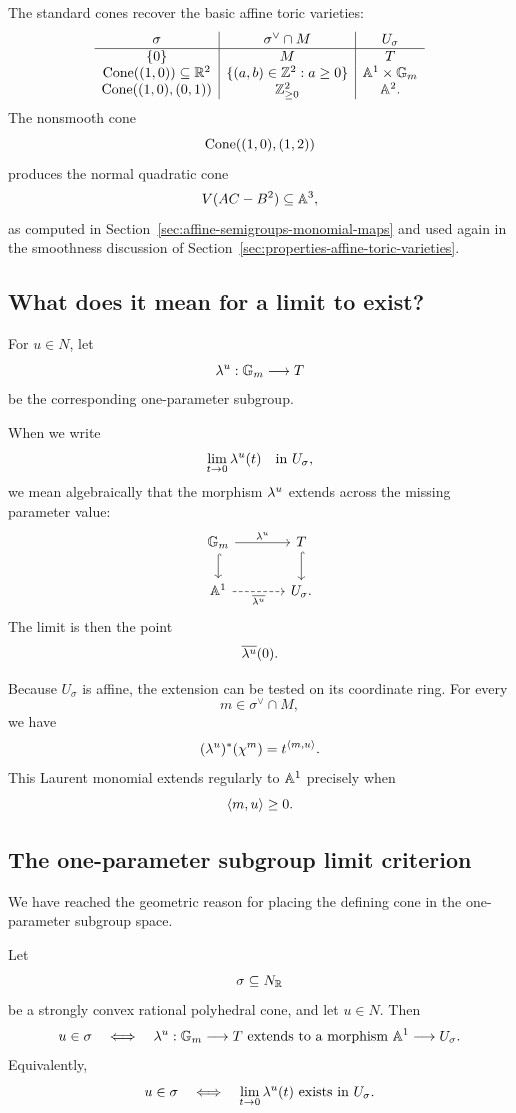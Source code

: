 The standard cones recover the basic affine toric varieties:
\[
\begin{array}{c|c|c}
\sigma&\sigma^\vee\cap M&U_\sigma\\
\hline
\{0\}&M&T\\
\operatorname{Cone}((1,0))\subseteq\mathbb{R}^2
&\{(a,b)\in\mathbb{Z}^2:a\geq0\}
&\mathbb{A}^1\times\mathbb{G}_{m}\\
\operatorname{Cone}((1,0),(0,1))
&\mathbb{Z}_{\geq0}^2
&\mathbb{A}^2.
\end{array}
\]
The nonsmooth cone
\[
\operatorname{Cone}((1,0),(1,2))
\]
produces the normal quadratic cone
\[
V(AC-B^2)\subseteq\mathbb{A}^3,
\]
as computed in Section~\ref{sec:affine-semigroups-monomial-maps} and
used again in the smoothness discussion of
Section~\ref{sec:properties-affine-toric-varieties}.

\subsection{What does it mean for a limit to exist?}

For \(u\in N\), let
\[
\lambda^{u}:\mathbb{G}_{m}\longrightarrow T
\]
be the corresponding one-parameter subgroup.

When we write
\[
\lim_{t\to0}\lambda^{u}(t)
\quad\text{in }U_\sigma,
\]
we mean algebraically that the morphism \(\lambda^{u}\) extends across
the missing parameter value:
\[
\begin{tikzcd}[column sep=large]
\Gm \arrow[r,"\oneps{u}"] \arrow[d,hook]
&
T \arrow[d,hook]
\\
\AAA^1 \arrow[r,dashed,"\overline{\oneps{u}}"']
&
U_\sigma.
\end{tikzcd}
\]
The limit is then the point
\[
\overline{\lambda^{u}}(0).
\]

Because \(U_\sigma\) is affine, the extension can be tested on its
coordinate ring. For every
\[
m\in\sigma^\vee\cap M,
\]
we have
\[
(\lambda^{u})^*(\chi^{m})
=
t^{\left\langle m,u\right\rangle}.
\]
This Laurent monomial extends regularly to \(\mathbb{A}^1\) precisely when
\[
\left\langle m,u\right\rangle\geq0.
\]

\subsection{The one-parameter subgroup limit criterion}

We have reached the geometric reason for placing the defining cone in
the one-parameter subgroup space.

\begin{theorem}
\label{thm:oneps-limit-criterion-affine}
Let
\[
\sigma\subseteq N_{\mathbb{R}}
\]
be a strongly convex rational polyhedral cone, and let \(u\in N\).
Then
\[
u\in\sigma
\quad\Longleftrightarrow\quad
\lambda^{u}:\mathbb{G}_{m}\longrightarrow T
\text{ extends to a morphism }
\mathbb{A}^1\longrightarrow U_\sigma.
\]
Equivalently,
\[
u\in\sigma
\quad\Longleftrightarrow\quad
\lim_{t\to0}\lambda^{u}(t)
\text{ exists in }U_\sigma.
\]
\end{theorem}

